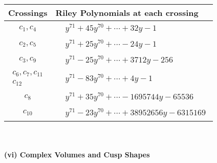 \documentclass[1p]{elsarticle_modified}
\theoremstyle{definition}
\begin{document}
\begin{tabular}{m{50pt}|m{274pt}}
Crossings & \hspace{64pt}Riley Polynomials at each crossing \\
\hline $$\begin{aligned}c_{1},c_{4}\end{aligned}$$&$\begin{aligned}
&y^{71}+45 y^{70}+\cdots+32 y-1
\end{aligned}$\\
\hline $$\begin{aligned}c_{2},c_{5}\end{aligned}$$&$\begin{aligned}
&y^{71}+25 y^{70}+\cdots-24 y-1
\end{aligned}$\\
\hline $$\begin{aligned}c_{3},c_{9}\end{aligned}$$&$\begin{aligned}
&y^{71}-25 y^{70}+\cdots+3712 y-256
\end{aligned}$\\
\hline $$\begin{aligned}c_{6},c_{7},c_{11}\\c_{12}\end{aligned}$$&$\begin{aligned}
&y^{71}-83 y^{70}+\cdots+4 y-1
\end{aligned}$\\
\hline $$\begin{aligned}c_{8}\end{aligned}$$&$\begin{aligned}
&y^{71}+35 y^{70}+\cdots-1695744 y-65536
\end{aligned}$\\
\hline $$\begin{aligned}c_{10}\end{aligned}$$&$\begin{aligned}
&y^{71}-23 y^{70}+\cdots+38952656 y-6315169
\end{aligned}$\\
\hline
\end{tabular}\\~\\
\newpage\flushleft \textbf{(vi) Complex Volumes and Cusp Shapes}
\end{document}
